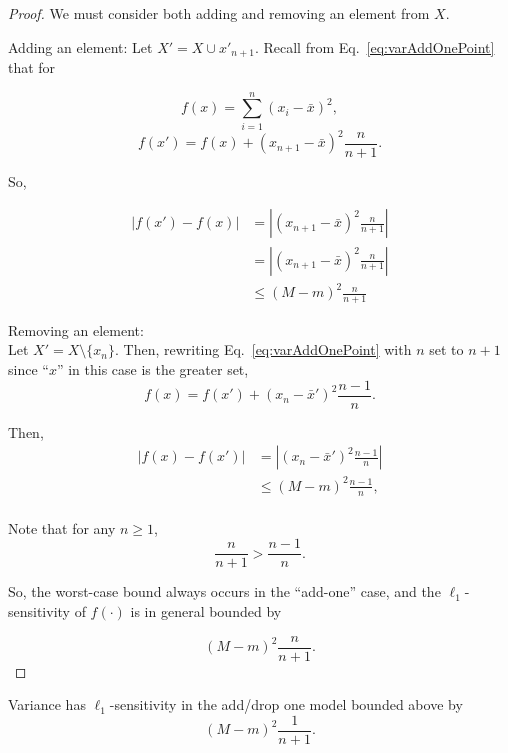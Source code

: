\documentclass[11pt]{scrartcl} %
\begin{document}
 \begin{proof}
 	We must consider both adding and removing an element from $X$. \newline

 	Adding an element: \newline
 	Let $X' = X \cup x'_{n+1}$. Recall from Eq.~\ref{eq:varAddOnePoint} that for

	$$ f(x) = \sum_{i=1}^n (x_i - \bar{x})^2, $$
	$$ f(x') = f(x) + (x_{n+1} - \bar{x})^2 \frac{n}{n+1}.$$

	So,

	\begin{align}
	\label{eq:L1add}
	\left\vert f(x') - f(x) \right\vert &= \left\vert (x_{n+1} - \bar{x})^2 \frac{n}{n+1} \right\vert \nonumber\\
		&= \left\vert (x_{n+1} - \bar{x})^2 \frac{n}{n+1} \right\vert \nonumber \\
		&\le \left( M-m \right)^2 \frac{n}{n+1} 
	\end{align}

	Removing an element: \\
	Let $X' = X \setminus \{x_n\}$. Then, rewriting Eq.~\ref{eq:varAddOnePoint} with $n$ set to $n+1$ since ``$x$'' in this case is the greater set,
	$$ f(x) = f(x') + (x_n - \bar{x}')^2 \frac{n-1}{n}.$$

	Then,
	\begin{align}
	\label{eq:L1sub}
	\left\vert f(x) - f(x') \right\vert &= \left\vert (x_n - \bar{x}')^2 \frac{n-1}{n} \right\vert \nonumber\\
		&\le (M-m)^2 \frac{n-1}{n},\\
	\end{align}

	Note that for any $n \ge 1$,
	\begin{equation}
	\label{ineq}
	 \frac{n}{n + 1} > \frac{n-1}{n}.
	\end{equation}

	So, the worst-case bound always occurs in the ``add-one'' case, and the $\ell_1$-sensitivity of $f(\cdot)$ is in general bounded by

\begin{equation}
\label{eq:fBoundaddsub}
\left( M-m \right)^2 \frac{n}{n + 1}.
\end{equation}

 \end{proof}

 \begin{corollary}
 \label{cor:l1addsub}
	Variance has $\ell_1$-sensitivity in the add/drop one model bounded above by
	$$\left( M-m \right)^2 \frac{1}{n+1}. $$
 \end{corollary}
 
\end{document}

